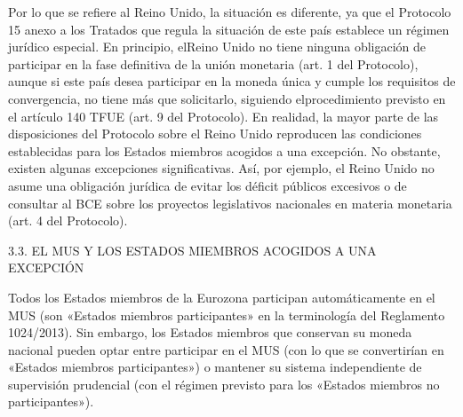 \documentclass[10pt,a4paper]{article}
\newcounter{anexo}
\begin{document}
Por lo que se refiere al Reino Unido, la situación es diferente, ya que el Protocolo 15 anexo a los Tratados que regula la situación de este país establece un régimen jurídico especial. En principio, elReino Unido no tiene ninguna obligación de participar en la fase definitiva de la unión monetaria (art. 1 del Protocolo), aunque si este país desea participar en la moneda única y cumple los requisitos de convergencia, no tiene más que solicitarlo, siguiendo elprocedimiento previsto en el artículo 140 TFUE (art. 9 del Protocolo). En realidad, la mayor parte de las disposiciones del Protocolo sobre el Reino Unido reproducen las condiciones establecidas para los Estados miembros acogidos a una excepción. No obstante, existen algunas excepciones significativas. Así, por ejemplo, el Reino Unido no asume una obligación jurídica de evitar los déficit públicos excesivos o de consultar al BCE sobre los proyectos legislativos nacionales en materia monetaria (art. 4 del Protocolo).

3.3. EL MUS Y LOS ESTADOS MIEMBROS ACOGIDOS A UNA EXCEPCIÓN

Todos los Estados miembros de la Eurozona participan  automáticamente en el MUS (son «Estados miembros participantes» en la terminología del Reglamento 1024/2013). Sin embargo, los Estados miembros que conservan su moneda nacional pueden optar entre participar en el MUS (con lo que se convertirían en «Estados miembros participantes») o mantener su sistema independiente de supervisión prudencial (con el régimen previsto para los «Estados miembros no participantes»).
\end{document}
